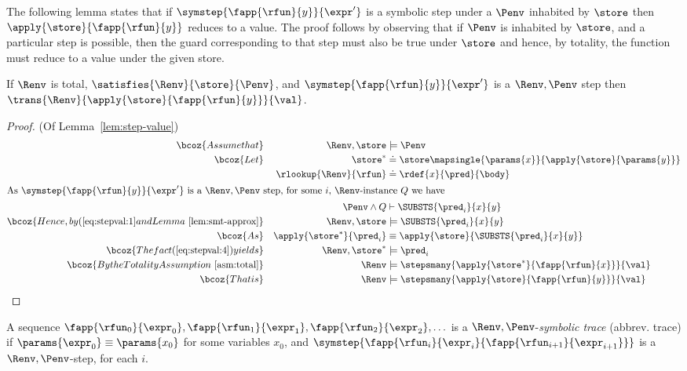 %
The following lemma states that if
$\symstep{\fapp{\rfun}{y}}{\expr'}$
is a symbolic step under a $\Penv$
inhabited by $\store$ then
$\apply{\store}{\fapp{\rfun}{y}}$
reduces to a value.
%
The proof follows by observing that if $\Penv$
is inhabited by $\store$, and a particular step
is possible, then the guard corresponding to that
step must also be true under $\store$ and hence,
by totality, the function must reduce to a value
under the given store.

\begin{lemma}\label{lem:step-value}
If $\Renv$ is total,
   $\satisfies{\Renv}{\store}{\Penv}$, and
   $\symstep{\fapp{\rfun}{y}}{\expr'}$ is a $\Renv,\Penv$ step
then $\trans{\Renv}{\apply{\store}{\fapp{\rfun}{y}}}{\val}$.
\end{lemma}


\begin{proof} (Of Lemma~\ref{lem:step-value})
\begin{alignat}{3}
\bcoz{Assume that}
  && \Renv, \store & \models \Penv \label{eq:stepval:1} \\
\bcoz{Let}
  && \store^*               & \doteq \store \mapsingle{\params{x}}{\apply{\store}{\params{y}}} \label{eq:stepval:2}\\
  && \rlookup{\Renv}{\rfun} & \doteq \rdef{x}{\pred}{\body} \label{eq:stepval:3} \\
\intertext{As $\symstep{\fapp{\rfun}{y}}{\expr'}$ is a $\Renv,\Penv$ step,
for some $i$, \Renv-instance $Q$ we have}
  && \Penv \wedge Q & \vdash \SUBSTS{\pred_i}{x}{y} \notag \\
\bcoz{Hence, by (\ref{eq:stepval:1} and Lemma~\ref{lem:smt-approx}}
  && \Renv, \store  & \models \SUBSTS{\pred_i}{x}{y} \label{eq:stepval:4}\\
\bcoz{As}
  && \apply{\store^*}{\pred_i}
  & \equiv \apply{\store}{\SUBSTS{\pred_i}{x}{y}} \\
\bcoz{The fact (\ref{eq:stepval:4}) yields}
  && \Renv, \store^*  & \models \pred_i \notag \\
\bcoz{By the Totality Assumption~\ref{asm:total}}
  && \Renv & \models \stepsmany{\apply{\store^*}{\fapp{\rfun}{x}}}{\val} \notag \\
\bcoz{That is}
  && \Renv & \models \stepsmany{\apply{\store}{\fapp{\rfun}{y}}}{\val} \notag
\end{alignat}
\end{proof}

%
A sequence
%
$\fapp{\rfun_0}{\expr_0},\fapp{\rfun_1}{\expr_1},\fapp{\rfun_2}{\expr_2},\ldots$
%
is a $\Renv,\Penv$-\emph{symbolic trace} (abbrev. trace)
if $\params{\expr_0} \equiv \params{x_0}$ for some variables $x_0$,
and $\symstep{\fapp{\rfun_i}{\expr_i}{\fapp{\rfun_{i+1}}{\expr_{i+1}}}}$
is a $\Renv,\Penv$-step, for each $i$.

